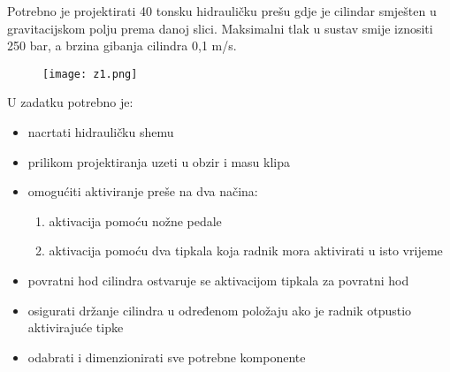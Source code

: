 \documentclass[zadatak]{FSBtex}
\author{prof. dr. sc. Pero Perić}
\begin{document}
\FootHeadSeminarZadatak

\begin{SeminarskiZadatak}
Potrebno je projektirati 40 tonsku hidrauličku prešu gdje je cilindar smješten u gravitacijskom polju prema danoj slici. Maksimalni tlak u sustav smije iznositi 250 bar, a brzina gibanja cilindra 0,1 m/s.
\begin{figure}[!h]
\centering
\texttt{[image: z1.png]}
\end{figure}

\noindent U zadatku potrebno je:
\begin{itemize}
\setlength\itemsep{-.25em}
\item nacrtati hidrauličku shemu

\item prilikom projektiranja uzeti u obzir i masu klipa

\item omogućiti aktiviranje preše na dva načina:
\begin{enumerate}
\item aktivacija pomoću nožne pedale
\item aktivacija pomoću dva tipkala koja radnik mora aktivirati u isto vrijeme
\end{enumerate}

\item povratni hod cilindra ostvaruje se aktivacijom tipkala za povratni hod

\item osigurati držanje cilindra u određenom položaju ako je radnik otpustio aktivirajuće tipke
\item odabrati i dimenzionirati sve potrebne komponente
\end{itemize}

\end{SeminarskiZadatak}
\end{document}
